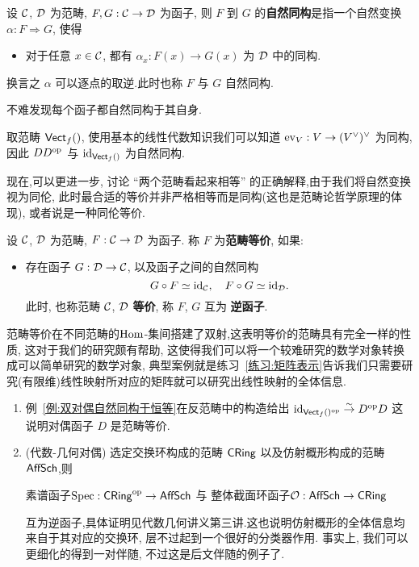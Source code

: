 \begin{definition}[自然同构]
    设 $\cal{C}$, $\cal{D}$ 为范畴, $F,G :\cal{C} \to \cal{D}$ 为函子, 则 $F$ 到 $G$ 的\textbf{自然同构}是指一个自然变换 $\alpha : F \Rightarrow G$, 使得
    \begin{itemize}
        \item 对于任意 $x\in \cal{C}$, 都有 $\alpha_x: F(x) \to G(x)$ 为 $\cal{D}$ 中的同构.
    \end{itemize}
    换言之 $\alpha$ 可以逐点的取逆.此时也称 $F$ 与 $G$ 自然同构.
\end{definition}
不难发现每个函子都自然同构于其自身.
\begin{example}\label{例:双对偶自然同构于恒等}
    取范畴 $\mathsf{Vect}_f(\relax)$, 使用基本的线性代数知识我们可以知道 $\operatorname{ev}_V : V \to (V^{\lor})^{\lor}$ 为同构, 因此 $DD^{\operatorname{op}}$ 与 $\mathrm{id}_{\mathsf{Vect}_f(\relax)}$ 为自然同构.
\end{example}
现在,可以更进一步, 讨论 ``两个范畴看起来相等'' 的正确解释,由于我们将自然变换视为同伦, 此时最合适的等价并非严格相等而是同构(这也是范畴论哲学原理的体现), 或者说是一种同伦等价.
\begin{definition}[范畴等价]
    设 $\cal{C}$, $\cal{D}$ 为范畴, $F: \cal{C} \to \cal{D}$ 为函子. 称 $F$ 为\textbf{范畴等价}, 如果:
    \begin{itemize}
        \item 存在函子 $G : \cal{D} \to \cal{C}$, 以及函子之间的自然同构
    \[
    G \circ F \simeq \mathrm{id}_{\cal{C}}, \quad F \circ G \simeq \mathrm{id}_{\cal{D}}.
    \]
    此时, 也称范畴 $\cal{C}$, $\cal{D}$ \textbf{等价}, 称 $F$, $G$ 互为 \textbf{逆函子}.
    \end{itemize}
\end{definition}
\begin{remark}
    范畴等价在不同范畴的$\operatorname{Hom}$-集间搭建了双射,这表明等价的范畴具有完全一样的性质, 这对于我们的研究颇有帮助, 这使得我们可以将一个较难研究的数学对象转换成可以简单研究的数学对象, 典型案例就是练习~\ref{练习:矩阵表示}告诉我们只需要研究(有限维)线性映射所对应的矩阵就可以研究出线性映射的全体信息.
\end{remark}
\begin{example}\label{例:范畴等价}
    \begin{enumerate}
        \item 例~\ref{例:双对偶自然同构于恒等}在反范畴中的构造给出 $\mathrm{id}_{\mathsf{Vect}_f(\relax)^{\operatorname{op}}}\stackrel{\sim}{\rightarrow} D^{\operatorname{op}}D$ 这说明对偶函子 $D$ 是范畴等价.
        \item(代数-几何对偶) 选定交换环构成的范畴 $\mathsf{CRing}$ 以及仿射概形构成的范畴 $\mathsf{AffSch}$,则
        \begin{center}
            素谱函子$\operatorname{Spec} : \mathsf{CRing}^{\operatorname{op}} \to \mathsf{AffSch}$ 与 整体截面环函子$\mathcal{O}: \mathsf{AffSch} \to \mathsf{CRing}$
        \end{center}
        互为逆函子,具体证明见代数几何讲义第三讲.这也说明仿射概形的全体信息均来自于其对应的交换环, 层不过起到一个很好的分类器作用. 事实上, 我们可以更细化的得到一对伴随, 不过这是后文伴随的例子了.
    \end{enumerate}
\end{example}
